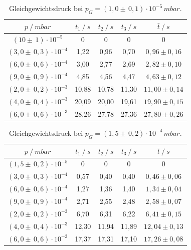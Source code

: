 \begin{table}[H]
\centering
\begin{tabular}{c|c|c|c|c}
	{$p \:/\: \si{mbar}$} & {$t_1 \:/\: \si{s} $} & {$t_2 \:/\: \si{s} $} & {$t_3 \:/\: \si{s} $} & {$\bar{t} \:/\: \si{s}$}\\
\midrule
$(10 \pm \, 1)\cdot 10^{-5}$ &0 &0 &0 &0\\
$(3,0 \pm \, 0,3)\cdot 10^{-4}$ &   1,22 &  0,96 &  0,70 & $0,96 \pm 0,16$\\
$(6,0 \pm \, 0,6)\cdot 10^{-4}$ &   3,00  &  2,77 &  2,69 & $2,82 \pm 0,10 $\\
$(9,0 \pm \, 0,9)\cdot 10^{-4}$ &   4,85 &  4,56 &  4,47 & $4,63 \pm 0,12 $\\
$(2,0 \pm \, 0,2)\cdot 10^{-3}$ &   10,88 &  10,78 &  11,30 & $11,00 \pm 0,14 $\\
$(4,0 \pm \, 0,4)\cdot 10^{-3}$ &   20,09 &  20,00 &  19,61 & $19,90 \pm 0,15 $\\
$(6,0 \pm \, 0,6)\cdot 10^{-3}$ &  28,26 & 27,78 & 27,36 & $27,80 \pm 0,26 $\\
\end{tabular}
\caption{Gleichgewichtsdruck bei $p_G=(1,0 \pm \, 0,1)\cdot 10^{-5} \, \si{mbar}$.}
\label{tab:leck_Turbo2}
\end{table}

\begin{table}[H]
\centering
\begin{tabular}{c|c|c|c|c}
	{$p \:/\: \si{mbar}$} & {$t_1 \:/\: \si{s} $} & {$t_2 \:/\: \si{s} $} & {$t_3 \:/\: \si{s} $} & {$\bar{t} \:/\: \si{s}$}\\
\midrule
$(1,5 \pm \, 0,2)\cdot 10^{-5}$ &0 &0 &0 &0\\
$(3,0 \pm \, 0,3)\cdot 10^{-4}$ &   0,57 &  0,40 &  0,40 & $0,46 \pm 0,06$\\
$(6,0 \pm \, 0,6)\cdot 10^{-4}$ &   1,27  &  1,36 &  1,40 & $1,34 \pm 0,04$\\
$(9,0 \pm \, 0,9)\cdot 10^{-4}$ &   2,71 &  2,55 &  2,48 & $2,58 \pm 0,07$\\
$(2,0 \pm \, 0,2)\cdot 10^{-3}$ &   6,70 &  6,31 &  6,22 & $6,41 \pm 0,15$\\
$(4,0 \pm \, 0,4)\cdot 10^{-3}$ &   12,30 &  11,94 &  11,89 & $12,04 \pm 0,13$\\
$(6,0 \pm \, 0,6)\cdot 10^{-3}$ &  17,37 & 17,31 & 17,10 & $17,26 \pm 0,08$\\
\end{tabular}
\caption{Gleichgewichtsdruck bei $p_G=(1,5 \pm \, 0,2)\cdot 10^{-4} \, \si{mbar}$.}
\label{tab:leck_Turbo3}
\end{table}

